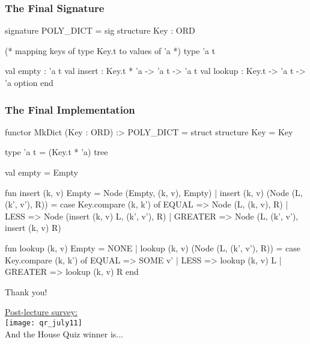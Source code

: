 \documentclass[aspectratio=169]{beamer}
\begin{document}
\begin{frame}[fragile]
  \frametitle{The Final Signature}
  \begin{codeblock}
    signature POLY_DICT =
      sig
        structure Key : ORD

        (* mapping keys of type Key.t to values of 'a *)
        type 'a t

        val empty : 'a t
        val insert : Key.t * 'a -> 'a t -> 'a t
        val lookup : Key.t -> 'a t -> 'a option
      end
  \end{codeblock}
\end{frame}
\begin{frame}[fragile]
  \frametitle{The Final Implementation}

  \tiny
  \begin{codeblock}
    functor MkDict (Key : ORD) :> POLY_DICT =
      struct
        structure Key = Key

        type 'a t = (Key.t * 'a) tree

        val empty = Empty

        fun insert (k, v) Empty = Node (Empty, (k, v), Empty)
          | insert (k, v) (Node (L, (k', v'), R)) =
              case Key.compare (k, k') of
                EQUAL   => Node (L, (k, v), R)
              | LESS    => Node (insert (k, v) L, (k', v'), R)
              | GREATER => Node (L, (k', v'), insert (k, v) R)

        fun lookup (k, v) Empty = NONE
          | lookup (k, v) (Node (L, (k', v'), R)) =
              case Key.compare (k, k') of
                EQUAL   => SOME v'
              | LESS    => lookup (k, v) L
              | GREATER => lookup (k, v) R
      end
  \end{codeblock}
\end{frame}

\begin{frame}[plain]
	\begin{center} Thank you! \end{center}

	\begin{center}
    {\color{blue} \href{https://docs.google.com/forms/d/e/1FAIpQLSfAjJB9M1Jt-AV_290144DaRvzkjqXklQ4Q3OL7lDIic3nx2g/viewform?usp=sf_link}{Post-lecture survey:}} \\
    \vspace{5pt}
    \texttt{[image: qr\_july11]} \\
    \vspace{5pt}
    And the House Quiz winner is...
  \end{center}
\end{frame}
\end{document}
